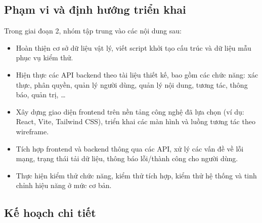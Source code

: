 \subsection{Phạm vi và định hướng triển khai}

Trong giai đoạn 2, nhóm tập trung vào các nội dung sau:

\begin{itemize}
    \item Hoàn thiện cơ sở dữ liệu vật lý, viết script khởi tạo cấu trúc và dữ liệu mẫu phục vụ kiểm thử.
    \item Hiện thực các API backend theo tài liệu thiết kế, bao gồm các chức năng: xác thực, phân quyền, quản lý người dùng, quản lý nội dung, tương tác, thông báo, quản trị, \ldots
    \item Xây dựng giao diện frontend trên nền tảng công nghệ đã lựa chọn (ví dụ: React, Vite, Tailwind CSS), triển khai các màn hình và luồng tương tác theo wireframe.
    \item Tích hợp frontend và backend thông qua các API, xử lý các vấn đề về lỗi mạng, trạng thái tải dữ liệu, thông báo lỗi/thành công cho người dùng.
    \item Thực hiện kiểm thử chức năng, kiểm thử tích hợp, kiểm thử hệ thống và tinh chỉnh hiệu năng ở mức cơ bản.
\end{itemize}

\subsection{Kế hoạch chi tiết}


